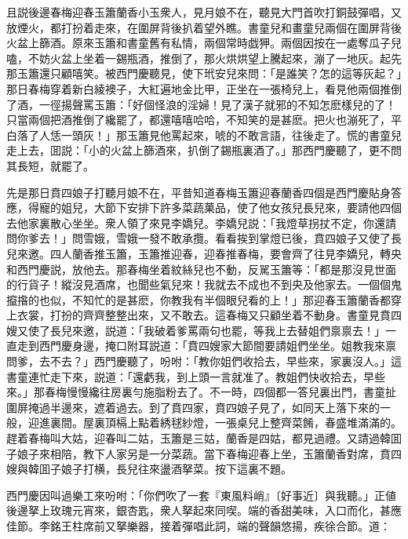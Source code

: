 且説後邊春梅迎春玉簫蘭香小玉衆人，見月娘不在，聽見大門首吹打銅鼓彈唱，又放煙火，都打扮着走來，在圍屏背後扒着望外瞧。書童兒和畫童兒兩個在圍屏背後火盆上篩酒。原來玉簫和書童舊有私情，兩個常時戯狎。兩個因按在一處奪瓜子兒嗑，不妨火盆上坐着一錫瓶酒，推倒了，那火烘烘望上騰起來，漰了一地灰。起先那玉簫還只顧嘻笑。被西門慶聽見，使下玳安兒來問：「是誰笑？怎的這等灰起？」那日春梅穿着新白綾襖子，大紅遍地金比甲，正坐在一張椅兒上，看見他兩個推倒了酒，一徑揚聲罵玉簫：「好個怪浪的淫婦！見了漢子就邪的不知怎麽樣兒的了！只當兩個把酒推倒了纔罷了，都還嘻嘻哈哈，不知笑的是甚麽。把火也漰死了，平白落了人恁一頭灰！」那玉簫見他罵起來，唬的不敢言語，往後走了。慌的書童兒走上去，囬説：「小的火盆上篩酒來，扒倒了錫瓶裏酒了。」那西門慶聽了，更不問其長短，就罷了。

先是那日賁四娘子打聽月娘不在，平昔知道春梅玉簫迎春蘭香四個是西門慶貼身答應，得寵的姐兒，大節下安排下許多菜蔬菓品，使了他女孩兒長兒來，要請他四個去他家裏散心坐坐。衆人領了來見李嬌兒。李嬌兒説：「我燈草拐扙不定，你還請問你爹去！」問雪娥，雪娥一發不敢承攬。看看挨到掌燈已後，賁四娘子又使了長兒來邀。四人蘭香推玉簫，玉簫推迎春，迎春推春梅，要會齊了往見李嬌兒，轉央和西門慶説，放他去。那春梅坐着紋絲兒也不動，反駡玉簫等：「都是那沒見世面的行貨子！縱沒見酒席，也聞些氣兒來！我就去不成也不到央及他家去。一個個鬼攛揝的也似，不知忙的是甚麽，你教我有半個眼兒看的上！」那迎春玉簫蘭香都穿上衣裳，打扮的齊齊整整出來，又不敢去。這春梅又只顧坐着不動身。書童見賁四嫂又使了長兒來邀，説道：「我破着爹罵兩句也罷，等我上去替姐們禀禀去！」一直走到西門慶身邊，掩口附耳説道：「賁四嫂家大節間要請姐們坐坐。姐教我來禀問爹，去不去？」西門慶聽了，吩咐：「教你姐們收拾去，早些來，家裏沒人。」這書童連忙走下來，説道：「還虧我，到上頭一言就准了。教姐們快收拾去，早些來。」那春梅慢慢纔往房裏勻施脂粉去了。不一時，四個都一答兒裏出門，書童扯圍屏掩過半邊來，遮着過去。到了賁四家，賁四娘子見了，如同天上落下來的一般，迎進裏間。屋裏頂槅上點着綉毬紗燈，一張桌兒上整齊菜餚，春盛堆滿滿的。趕着春梅叫大姑，迎春叫二姑，玉簫是三姑，蘭香是四姑，都見過禮。又請過韓囬子娘子來相陪，教下人家另是一分菜蔬。當下春梅迎春上坐，玉簫蘭香對席，賁四嫂與韓囬子娘子打横，長兒往來盪酒拏菜。按下這裏不題。

西門慶因叫過樂工來吩咐：「你們吹了一套『東風料峭』〔好事近〕與我聽。」正値後邊拏上玫瑰元宵來，銀杏匙，衆人拏起來同喫。端的香甜美味，入口而化，甚應佳節。李銘王柱席前又拏樂器，接着彈唱此詞，端的聲韻悠揚，疾徐合節。道：

